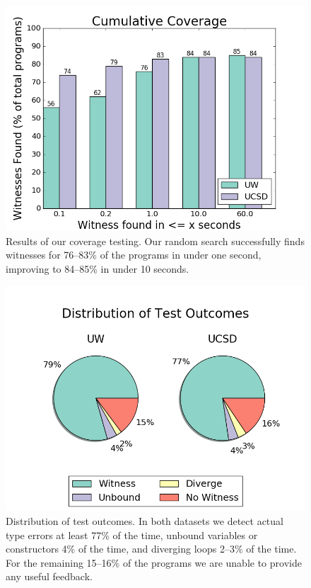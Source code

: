\begin{figure}[t]
\centering
\includegraphics[width=0.7\linewidth]{coverage.png}
\caption{Results of our coverage testing. Our random search successfully
  finds witnesses for 76--83\% of the programs in under one second,
  improving to 84--85\% in under 10 seconds. }
\label{fig:results-witness}
\end{figure}
\begin{figure}[t]
\includegraphics[width=0.7\linewidth]{distrib.png}
\caption{Distribution of test outcomes. In both datasets we detect
  actual type errors at least 77\% of the time, unbound variables or
  constructors 4\% of the time, and diverging loops 2--3\% of the
  time. For the remaining 15--16\% of the programs we are unable to
  provide any useful feedback. }
\label{fig:results-distrib}
\end{figure}


